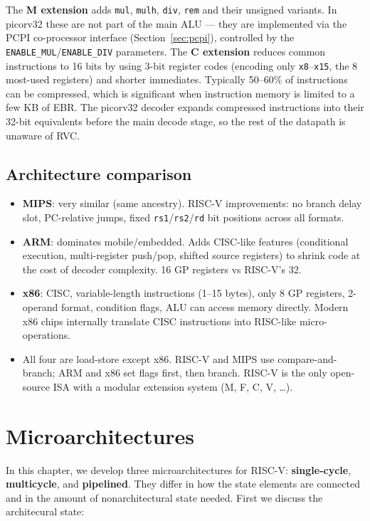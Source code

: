 \documentclass[9pt, a4paper]{extarticle}
\begin{document}
The \textbf{M extension} adds \texttt{mul}, \texttt{mulh}, \texttt{div}, \texttt{rem} and their unsigned variants. In picorv32 these are not part of the main ALU --- they are implemented via the PCPI co-processor interface (Section~\ref{sec:pcpi}), controlled by the \texttt{ENABLE\_MUL}/\texttt{ENABLE\_DIV} parameters. The \textbf{C extension} reduces common instructions to 16 bits by using 3-bit register codes (encoding only \texttt{x8}--\texttt{x15}, the 8 most-used registers) and shorter immediates. Typically 50--60\% of instructions can be compressed, which is significant when instruction memory is limited to a few KB of EBR. The picorv32 decoder expands compressed instructions into their 32-bit equivalents before the main decode stage, so the rest of the datapath is unaware of RVC.

\subsection{Architecture comparison}

\begin{itemize}
    \item \textbf{MIPS}: very similar (same ancestry). RISC-V improvements: no branch delay slot, PC-relative jumps, fixed \texttt{rs1}/\texttt{rs2}/\texttt{rd} bit positions across all formats.
    \item \textbf{ARM}: dominates mobile/embedded. Adds CISC-like features (conditional execution, multi-register push/pop, shifted source registers) to shrink code at the cost of decoder complexity. 16 GP registers vs RISC-V's 32.
    \item \textbf{x86}: CISC, variable-length instructions (1--15 bytes), only 8 GP registers, 2-operand format, condition flags, ALU can access memory directly. Modern x86 chips internally translate CISC instructions into RISC-like micro-operations.
    \item All four are load-store except x86. RISC-V and MIPS use compare-and-branch; ARM and x86 set flags first, then branch. RISC-V is the only open-source ISA with a modular extension system (M, F, C, V, \ldots).
\end{itemize}

\newpage

\section{Microarchitectures}
\label{sec:microarch}


In this chapter, we develop three microarchitectures for RISC-V: \textbf{single-cycle}, \textbf{multicycle}, and \textbf{pipelined}. They differ in how the state elements are connected and in the amount of nonarchitectural state needed. First we discuss the architecural state:
\end{document}
